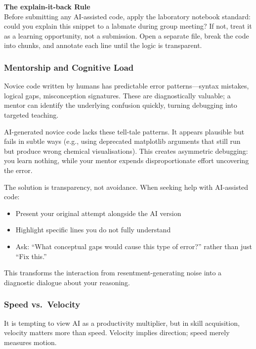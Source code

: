 \begin{tip}
\textbf{The explain-it-back Rule} \\
Before submitting any AI-assisted code, apply the laboratory notebook standard: could you explain this snippet to a labmate during group meeting? If not, treat it as a learning opportunity, not a submission. Open a separate file, break the code into chunks, and annotate each line until the logic is transparent.
\end{tip}

\subsubsection*{Mentorship and Cognitive Load}

Novice code written by humans has predictable error patterns---syntax mistakes, logical gaps, misconception signatures. These are diagnostically valuable; a mentor can identify the underlying confusion quickly, turning debugging into targeted teaching.

AI-generated novice code lacks these tell-tale patterns. It appears plausible but fails in subtle ways (e.g., using deprecated matplotlib arguments that still run but produce wrong chemical visualisations). This creates asymmetric debugging: you learn nothing, while your mentor expends disproportionate effort uncovering the error.

The solution is transparency, not avoidance. When seeking help with AI-assisted code:
\begin{itemize}
    \item Present your original attempt alongside the AI version
    \item Highlight specific lines you do not fully understand
    \item Ask: ``What conceptual gaps would cause this type of error?'' rather than just ``Fix this.''
\end{itemize}
This transforms the interaction from resentment-generating noise into a diagnostic dialogue about your reasoning.

\subsubsection*{Speed vs.\ Velocity}

It is tempting to view AI as a productivity multiplier, but in skill acquisition, velocity matters more than speed. Velocity implies direction; speed merely measures motion. 

